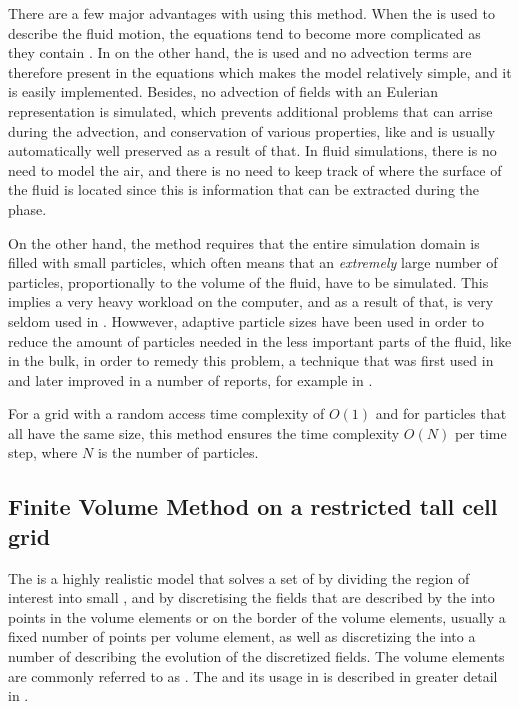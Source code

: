 There are a few major advantages with using this method. When the  is used to describe the fluid motion, the equations tend to become more complicated as they contain . In \SPH on the other hand, the  is used and no advection terms are therefore present in the equations which makes the model relatively simple, and it is easily implemented. Besides, no advection of fields with an Eulerian representation is simulated, which prevents additional problems that can arrise during the advection, and conservation of various properties, like \momentum and \energy is usually automatically well preserved as a result of that. In fluid simulations, there is no need to model the air, and there is no need to keep track of where the surface of the fluid is located since this is information that can be extracted during the  phase.

On the other hand, the \SPH method requires that the entire simulation domain is filled with small particles, which often means that an \emph{extremely} large number of particles, proportionally to the volume of the fluid, have to be simulated. This implies a very heavy workload on the computer, and as a result of that, \SPH is very seldom used in . Howwever, adaptive particle sizes have been used in order to reduce the amount of particles needed in the less important parts of the fluid, like in the bulk, in order to remedy this problem, a technique that was first used in \citep{Desbrun1999} and later improved in a number of reports, for example in \citep{Yan2009}.

For a grid with a random access time complexity of $O(1)$ and for particles that all have the same size, this method ensures the time complexity $O(N)$ per time step, where $N$ is the number of particles.

\subsection{Finite Volume Method on a restricted tall cell grid}

The \FVM is a highly realistic model that solves a set of \PDEs by dividing the region of interest into small , and by discretising the fields that are described by the \PDEs into points in the volume elements or on the border of the volume elements, usually a fixed number of points per volume element, as well as discretizing the \PDEs into a number of \ODEs describing the evolution of the discretized fields. The volume elements are commonly referred to as \cells. The \FVM and its usage in \CFD is described in greater detail in .

